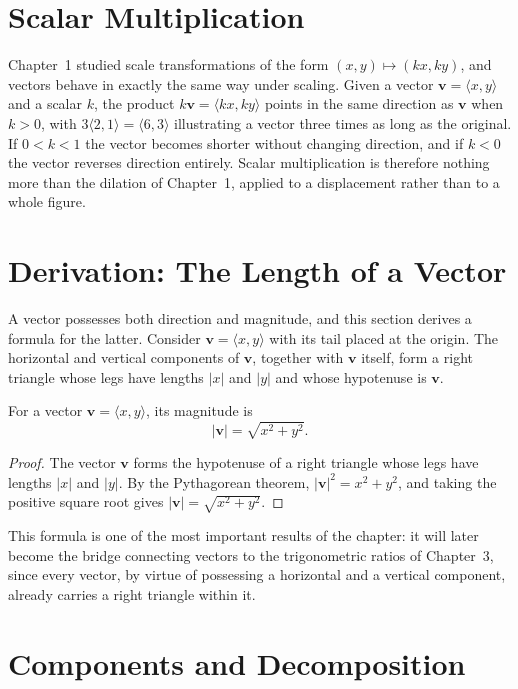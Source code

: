 \section{Scalar Multiplication}

Chapter~1 studied scale transformations of the form $(x,y) \mapsto (kx,ky)$,
and vectors behave in exactly the same way under scaling. Given a vector
$\mathbf{v} = \langle x,y \rangle$ and a scalar $k$, the product
$k\mathbf{v} = \langle kx, ky \rangle$ points in the same direction as
$\mathbf{v}$ when $k>0$, with $3\langle 2,1\rangle = \langle 6,3\rangle$
illustrating a vector three times as long as the original. If $0 < k < 1$
the vector becomes shorter without changing direction, and if $k < 0$ the
vector reverses direction entirely. Scalar multiplication is therefore
nothing more than the dilation of Chapter~1, applied to a displacement
rather than to a whole figure.

\section{Derivation: The Length of a Vector}

A vector possesses both direction and magnitude, and this section derives a
formula for the latter. Consider $\mathbf{v} = \langle x,y \rangle$ with its
tail placed at the origin. The horizontal and vertical components of
$\mathbf{v}$, together with $\mathbf{v}$ itself, form a right triangle whose
legs have lengths $|x|$ and $|y|$ and whose hypotenuse is $\mathbf{v}$.

\begin{theorem}
For a vector $\mathbf{v} = \langle x,y \rangle$, its magnitude is
\[
|\mathbf{v}| = \sqrt{x^2+y^2}.
\]
\end{theorem}

\begin{proof}
The vector $\mathbf{v}$ forms the hypotenuse of a right triangle whose legs
have lengths $|x|$ and $|y|$. By the Pythagorean theorem,
$|\mathbf{v}|^2 = x^2 + y^2$, and taking the positive square root gives
$|\mathbf{v}| = \sqrt{x^2+y^2}$.
\end{proof}

This formula is one of the most important results of the chapter: it will
later become the bridge connecting vectors to the trigonometric ratios of
Chapter~3, since every vector, by virtue of possessing a horizontal and a
vertical component, already carries a right triangle within it.

\section{Components and Decomposition}

